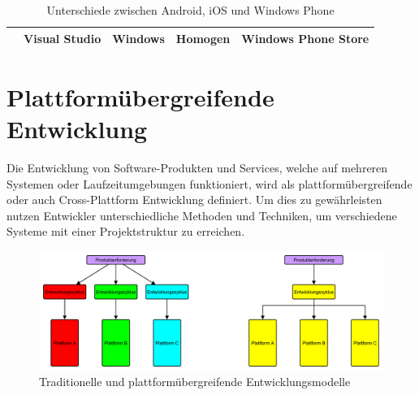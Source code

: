 \begin{table}[htbp]
{\begin{tabular}{p{5cm}|c|c|c|c|}
			\multicolumn{1}{|c|}{\cellcolor[HTML]{00009B}{\color[HTML]{FFFFFF} \textbf{Windows Phone}}} &  Visual Studio                                               & Windows                                                           & Homogen                                                        & Windows Phone Store                                               \\ \hline
		\end{tabular}
	}
	\caption{Unterschiede zwischen Android, iOS und Windows Phone}
	\label{platform_differnces}
\end{table}


\chapter{Plattformübergreifende Entwicklung}
Die Entwicklung von Software-Produkten und Services, welche auf mehreren Systemen oder Laufzeitumgebungen funktioniert, wird als plattformübergreifende oder auch Cross-Plattform Entwicklung definiert. Um dies zu gewährleisten nutzen Entwickler unterschiedliche Methoden und Techniken, um verschiedene Systeme mit einer Projektstruktur zu erreichen.\citep{cross_plattform_explanation}

\begin{figure}[htbp]
	\centering
	\includegraphics[width=1\textwidth]{Bilder/nativ_vs_cross}
	\caption{Traditionelle und plattformübergreifende Entwicklungsmodelle}\label{graph_nativ_vs_cross}
\end{figure}


